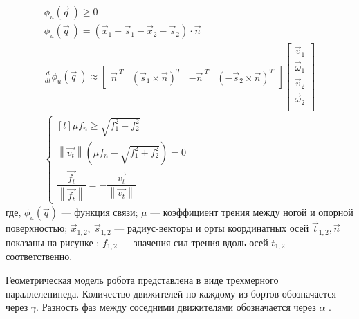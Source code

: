\begin{align}
    \label{eq:contact_inter}
    \phi_u(\vec{q}\ ) \geqslant 0 \\ 
                        \phi_u(\vec{q}\ ) = (\vec{x}_1 + \vec{s}_1 - \vec{x}_2 - \vec{s}_2) \cdot \vec{n} \\
                        \frac{d }{d t}\phi_u(\vec{q}\ ) \approx \begin{bmatrix}
                            \vec{n}^{\ T} & (\vec{s}_1 \times \vec{n})^T & -\vec{n}^{\ T} & (-\vec{s}_2 \times \vec{n})^T
                        \end{bmatrix} \begin{bmatrix}
                            \vec{v}_1\\ 
                        \vec{\omega}_1\\ 
                        \vec{v}_2\\
                        \vec{\omega}_2\\
                        \end{bmatrix} \\
\left\{\begin{matrix*}[l]
\mu f_n \geqslant \sqrt{f_1^2 + f_2^2}\\ 
\left\lVert \vec{v_t}\right\rVert (\mu f_n - \sqrt{f_1^2 + f_2^2}) = 0\\
\dfrac{\vec{f_t}}{\left\lVert \vec{f_t}\right\rVert } = - \dfrac{\vec{v_t}}{\left\lVert \vec{v_t}\right\rVert }
\end{matrix*}\right.
\end{align}
где, $\phi_u(\vec{q})$ --- функция связи; $\mu $ --- коэффициент трения между ногой и опорной поверхностью; $\vec{x}_{1,2},\ \vec{s}_{1,2}$ --- радиус-векторы и орты координатных осей $\vec{t}_{1,2}, \vec{n}$ показаны на рисунке ; $ f_{1,2} $ --- значения сил трения вдоль осей $t_{1,2}$ соответственно.

Геометрическая модель робота представлена в виде трехмерного параллелепипеда. Количество движителей по каждому из бортов обозначается через $\gamma$. Разность фаз между соседними движителями обозначается через  $\alpha$ .

